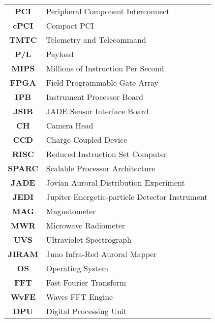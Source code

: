 \begin{multicols}{2}
{\begin{xltabular}{\linewidth}{c>{\raggedright\arraybackslash}X}
		\textbf{PCI} & Peripheral Component Interconnect \\
		\textbf{cPCI} & Compact PCI \\
		\textbf{TMTC} & Telemetry and Telecommand \\
		\textbf{P/L} & Payload \\
		\textbf{MIPS} & Millions of Instruction Per Second \\ 
		\textbf{FPGA} & Field Programmable Gate Array \\
		\textbf{IPB} & Instrument Processor Board \\
		\textbf{JSIB} & JADE Sensor Interface Board \\
		\textbf{CH} & Camera Head \\
		\textbf{CCD} & Charge-Coupled Device \\
		\textbf{RISC} & Reduced Instruction Set Computer \\
		\textbf{SPARC} & Scalable Processor Architecture \\
		\textbf{JADE} & Jovian Auroral Distribution Experiment \\
		\textbf{JEDI} & Jupiter Energetic-particle Detector Instrument \\
		\textbf{MAG} & Magnetometer \\
		\textbf{MWR} & Microwave Radiometer \\
		\textbf{UVS} & Ultraviolet Spectrograph \\
		\textbf{JIRAM} & Juno Infra-Red Auroral Mapper \\
		\textbf{OS} & Operating System \\
		\textbf{FFT} & Fast Fourier Transform \\
		\textbf{WvFE} & Waves FFT Engine \\
		\textbf{DPU} & Digital Processing Unit \\
 	\end{xltabular}
	\unskip
	\unpenalty
	\unpenalty}
	\unvbox\ltmcbox
\end{multicols}